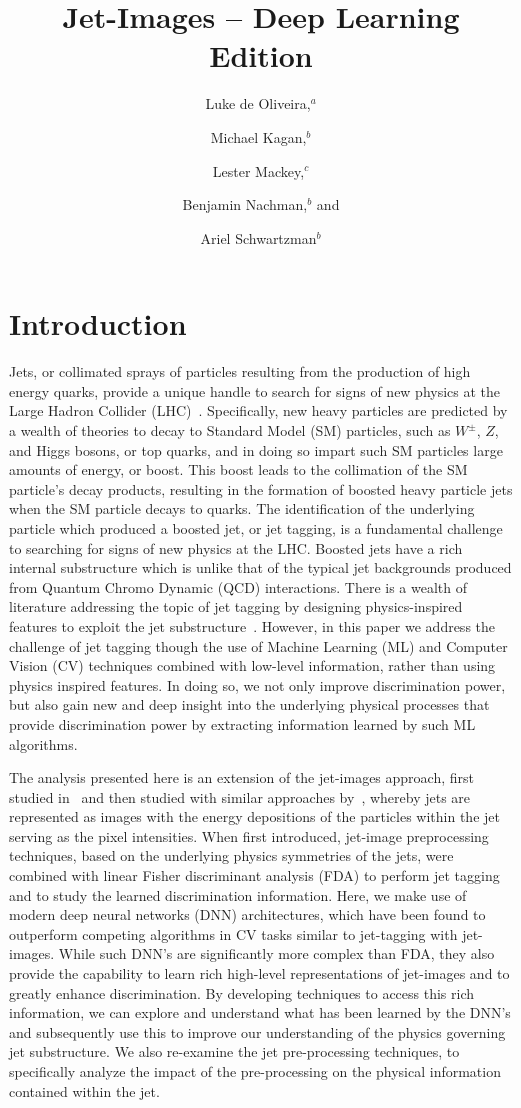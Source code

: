 \documentclass{article}
\title{Jet-Images -- Deep Learning Edition}
\author{Luke de Oliveira,${}^a$}
\author{Michael Kagan,${}^{b}$}
\author{Lester Mackey,${}^c$}
\author{Benjamin Nachman,${}^{b}$ and}
\author{Ariel Schwartzman${}^b$}
\affiliation{$^{a}$ Institute for Computational and Mathematical Engineering, Stanford University, Stanford, CA 94305, USA}
\affiliation{$^{b}$SLAC National Accelerator Laboratory, Stanford University, 2575 Sand Hill Rd, Menlo Park,
  CA 94025, U.S.A.}
\affiliation{$^{a}$Department of Statistics, Stanford University, Stanford, CA 94305, USA}
\begin{document}
\maketitle

\section{Introduction}
Jets, or collimated sprays of particles resulting from the production of high energy quarks, provide a unique handle to search for signs of new physics at the Large Hadron Collider (LHC)~\cite{LHC}.  Specifically, new heavy particles are predicted by a wealth of theories to decay to Standard Model (SM) particles, such as $W^{\pm}$, $Z$, and Higgs bosons, or top quarks, and in doing so impart such SM particles large amounts of energy, or boost.  This boost leads to the collimation of the SM particle's decay products, resulting in the formation of boosted heavy particle jets when the SM particle decays to quarks.   The identification of the underlying particle which produced a boosted jet, or jet tagging, is a fundamental challenge to searching for signs of new physics at the LHC.  Boosted jets have a rich internal substructure which is unlike that of the typical jet backgrounds produced from Quantum Chromo Dynamic (QCD) interactions. There is a wealth of literature addressing the topic of jet tagging by designing physics-inspired features to exploit the jet substructure~\cite{stuff}.  However, in this paper we address the challenge of jet tagging though the use of Machine Learning (ML) and Computer Vision (CV) techniques combined with low-level information, rather than using physics inspired features.  In doing so, we not only improve discrimination power, but also gain new and deep insight into the underlying physical processes that provide discrimination power by extracting information learned by such ML algorithms. 

The analysis presented here is an extension of the jet-images approach, first studied in~\cite{JetImages} and then studied with similar approaches by~\cite{Others}, whereby jets are represented as images with the energy depositions of the particles within the jet serving as the pixel intensities.  When first introduced, jet-image preprocessing techniques, based on the underlying physics symmetries of the jets, were combined with linear Fisher discriminant analysis (FDA) to perform jet tagging and to study the learned discrimination information.  Here, we make use of modern deep neural networks (DNN) architectures, which have been found to outperform competing algorithms in CV tasks similar to jet-tagging with jet-images.  While such DNN's are significantly more complex than FDA, they also provide the capability to learn rich high-level representations of jet-images and to greatly enhance discrimination.  By developing techniques to access this rich information, we can explore and understand what has been learned by the DNN's and subsequently use this to improve our understanding of the physics governing jet substructure.  We also re-examine the jet pre-processing techniques, to specifically analyze the impact of the pre-processing on the physical information contained within the jet.
\end{document}
